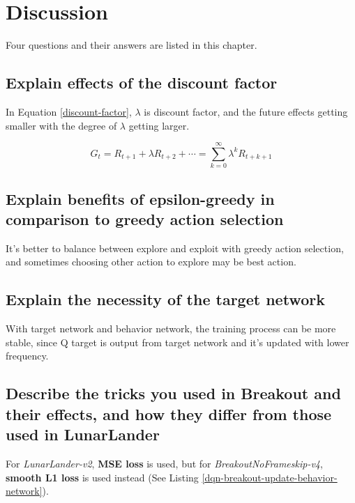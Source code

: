 \chapter{Discussion}
\indent
    Four questions and their answers are listed in this chapter.
	
\section{Explain effects of the discount factor}
\indent
    In Equation \ref{discount-factor}, $\lambda$ is discount factor, and 
    the future effects getting smaller with the degree of $\lambda$ getting larger.

    \begin{equation}\label{discount-factor}
        G_t = R_{t + 1} + \lambda R_{t + 2} + \cdots = \sum_{k = 0}^\infty\lambda^kR_{t + k + 1}
    \end{equation}

\section{Explain benefits of epsilon-greedy in comparison to greedy action selection}
\indent
    It's better to balance between explore and exploit with greedy action selection, and
    sometimes choosing other action to explore may be best action.

\section{Explain the necessity of the target network}
\indent
    With target network and behavior network, the training process can be more stable, since 
    Q target is output from target network and it's updated with lower frequency.

\section{Describe the tricks you used in Breakout and their effects, and how they differ from those used in LunarLander}
\indent
    For \textit{LunarLander-v2}, \textbf{MSE loss} is used, but for \textit{BreakoutNoFrameskip-v4}, 
    \textbf{smooth L1 loss} is used instead (See Listing \ref{dqn-breakout-update-behavior-network}).

